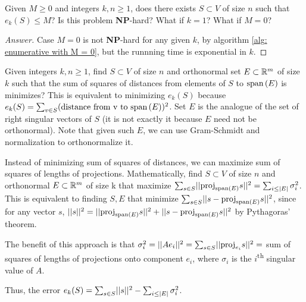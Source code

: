 \documentclass{article}
\begin{document}
\begin{question}\label{Q: binary question}
    Given $M \geq 0$ and integers $k,n\geq 1$, does there exists  $S\subset V$ of size $n$ such that $e_k(S)\leq M$? Is this problem \textbf{NP}-hard? What if $k=1$? What if $M=0$?
\end{question}

\begin{proof}[Answer]
Case $M=0$ is not \textbf{NP}-hard for any given $k$, by algorithm \ref{alg: enumerative with M = 0}, but the runnning time is exponential in $k$.
\end{proof}

\begin{question}
\label{Q: geometric question}
    Given integers $k,n\geq 1$, find $S\subset V$ of size $n$ and orthonormal set $E\subset \mathbb{R}^m$ of size $k$ such that the sum of squares of distances from elements of $S$ to $\text{span}\left(E\right)$ is minimizes? This is equivalent to minimizing $e_k(S)$ because $e_k(S) = \sum_{v\in S}(\text{distance from v to $\text{span}\left(E\right)$})^2$. Set $E$ is the analogue of the set of right singular vectors of $S$ (it is not exactly it because $E$ need not be orthonormal). Note that given such $E$, we can use Gram-Schmidt and normalization to orthonormalize it.
\end{question}

\begin{question}\label{Q: geometric question 2}
    Instead of minimizing sum of squares of distances, we can maximize sum of squares of lengths of projections. Mathematically, find $S\subset V$ of size $n$ and orthonormal $E\subset \mathbb{R}^m$ of size k that maximize $\sum_{s\in S} \norm{\proj_{\vspan{E}}s}^2 = \sum_{i\leq |E|}\sigma_i^2$. This is equivalent to finding $S,E$ that minimize $\sum_{s\in S} \norm{s-\proj_{\vspan{E}}s}^2$, since for any vector $s$, $||s||^2 = ||\text{proj}_{\text{span}\left(E\right)}s||^2 + ||s-\text{proj}_{\text{span}\left(E\right)}s||^2$ by Pythagoras' theorem.
    
    The benefit of this approach is that $\sigma_i^2 = \norm{Ae_i}^2 = \sum_{s\in S} \norm{\proj_{e_i}s}^2=$ sum of squares of lengths of projections onto component $e_i$, where $\sigma_i$ is the $i$\textsuperscript{th} singular value of $A$.
    
    Thus, the error $e_k(S) = \sum_{s\in S}\norm{s}^2 - \sum_{i\leq |E|}\sigma_i^2$.
\end{question}
\end{document}
